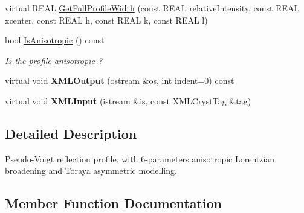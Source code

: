 \begin{DoxyCompactItemize}
\item 
virtual R\+E\+AL \mbox{\hyperlink{class_obj_cryst_1_1_reflection_profile_pseudo_voigt_anisotropic_a43a9c77aa312df5ca00969c7f866f7a4}{Get\+Full\+Profile\+Width}} (const R\+E\+AL relative\+Intensity, const R\+E\+AL xcenter, const R\+E\+AL h, const R\+E\+AL k, const R\+E\+AL l)
\item 
\mbox{\label{class_obj_cryst_1_1_reflection_profile_pseudo_voigt_anisotropic_af93bf4e35a2c1f20d7fe163a10d7edc4}} 
bool \mbox{\hyperlink{class_obj_cryst_1_1_reflection_profile_pseudo_voigt_anisotropic_af93bf4e35a2c1f20d7fe163a10d7edc4}{Is\+Anisotropic}} () const
\begin{DoxyCompactList}\small\item\em Is the profile anisotropic ? \end{DoxyCompactList}\item 
\mbox{\label{class_obj_cryst_1_1_reflection_profile_pseudo_voigt_anisotropic_a9feff3b20740c248c8cf33871df052b2}} 
virtual void {\bfseries X\+M\+L\+Output} (ostream \&os, int indent=0) const
\item 
\mbox{\label{class_obj_cryst_1_1_reflection_profile_pseudo_voigt_anisotropic_a9d6d4d2245b286152148c5a1129f9bc1}} 
virtual void {\bfseries X\+M\+L\+Input} (istream \&is, const X\+M\+L\+Cryst\+Tag \&tag)
\end{DoxyCompactItemize}


\subsection{Detailed Description}
Pseudo-\/\+Voigt reflection profile, with 6-\/parameters anisotropic Lorentzian broadening and Toraya asymmetric modelling. 

\subsection{Member Function Documentation}
\mbox{\label{class_obj_cryst_1_1_reflection_profile_pseudo_voigt_anisotropic_a43a9c77aa312df5ca00969c7f866f7a4}} 
